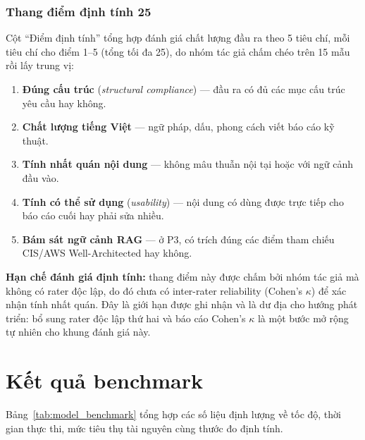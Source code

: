 \subsubsection*{Thang điểm định tính 25}
Cột ``Điểm định tính'' tổng hợp đánh giá chất lượng đầu ra theo 5 tiêu chí, mỗi tiêu chí cho điểm 1--5 (tổng tối đa 25), do nhóm tác giả chấm chéo trên 15 mẫu rồi lấy trung vị:
\begin{enumerate}
  \item \textbf{Đúng cấu trúc} (\textit{structural compliance}) --- đầu ra có đủ các mục cấu trúc yêu cầu hay không.
  \item \textbf{Chất lượng tiếng Việt} --- ngữ pháp, dấu, phong cách viết báo cáo kỹ thuật.
  \item \textbf{Tính nhất quán nội dung} --- không mâu thuẫn nội tại hoặc với ngữ cảnh đầu vào.
  \item \textbf{Tính có thể sử dụng} (\textit{usability}) --- nội dung có dùng được trực tiếp cho báo cáo cuối hay phải sửa nhiều.
  \item \textbf{Bám sát ngữ cảnh RAG} --- ở P3, có trích đúng các điểm tham chiếu CIS/AWS Well-Architected hay không.
\end{enumerate}

\textbf{Hạn chế đánh giá định tính:} thang điểm này được chấm bởi nhóm tác giả mà không có rater độc lập, do đó chưa có inter-rater reliability (Cohen's $\kappa$) để xác nhận tính nhất quán. Đây là giới hạn được ghi nhận và là dư địa cho hướng phát triển: bổ sung rater độc lập thứ hai và báo cáo Cohen's $\kappa$ là một bước mở rộng tự nhiên cho khung đánh giá này.

\section{Kết quả benchmark}
\label{app:model_benchmark_results}

Bảng~\ref{tab:model_benchmark} tổng hợp các số liệu định lượng về tốc độ, thời gian thực thi, mức tiêu thụ tài nguyên cùng thước đo định tính.

